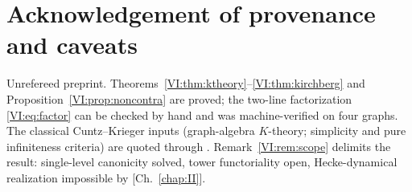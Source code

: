 \section*{Acknowledgement of provenance and caveats}

Unrefereed preprint. Theorems~\ref{VI:thm:ktheory}--\ref{VI:thm:kirchberg} and
Proposition~\ref{VI:prop:noncontra} are proved; the two-line factorization
\eqref{VI:eq:factor} can be checked by hand and was machine-verified on four graphs.
The classical Cuntz--Krieger inputs (graph-algebra $K$-theory; simplicity and pure
infiniteness criteria) are quoted through \cite{CK}. Remark~\ref{VI:rem:scope} delimits the result: single-level canonicity
solved, tower functoriality open, Hecke-dynamical realization impossible by [Ch.~\ref{chap:II}].
